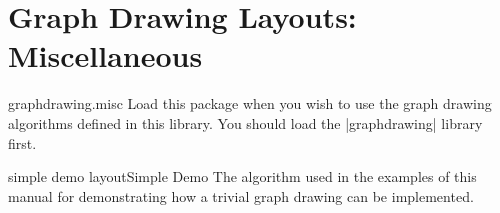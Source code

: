 %
%
%

\section{Graph Drawing Layouts: Miscellaneous}


\begin{tikzlibrary}{graphdrawing.misc}
  Load this package when you wish to use the graph drawing algorithms
  defined in this library. You should load the |graphdrawing| library first.
\end{tikzlibrary}


\begin{gdalgorithm}{simple demo layout}{Simple Demo}
  The algorithm used in the examples of this manual for demonstrating
  how a trivial graph drawing can be implemented.
\end{gdalgorithm}




